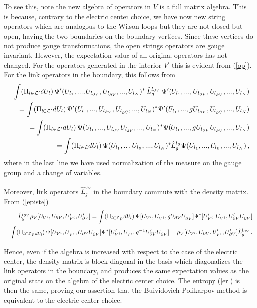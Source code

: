 \documentclass[12pt,a4paper]{article}
\newcommand{\bea}{\begin{eqnarray}}
\newcommand{\eea}{\end{eqnarray}}
\begin{document}
To see this, note the new algebra of operators in $V$ is a full matrix algebra. This is because, contrary to the electric center choice, we 
have now new string operators which are analogous to the Wilson loops but they are not closed but open, having the two boundaries on the 
boundary vertices. Since these vertices do not produce gauge transformations, the open strings operators are gauge invariant. However, 
the expectation value of all original operators has not changed. For the operators generated in the interior $V^i$ this is evident from (\ref{op}). 
For the link operators in the boundary, this follows from 
\bea
&&\int (\Pi_{l\in {\cal L}^\prime} dU_l) \,\Psi^\prime(U_{l_1},...,U_{l_{\partial V}},U_{l_{\partial \bar{V}}},...,U_{l_N})^*\, \hat{L}^{l_{\partial V}}_{g}\, \Psi^\prime(U_{l_1},...,U_{l_{\partial V}},U_{l_{\partial \bar{V}}},...,U_{l_N})\nonumber\\
&&=\int (\Pi_{l\in {\cal L}^\prime} dU_l) \,\Psi^\prime(U_{l_1},...,U_{l_{\partial V}},U_{l_{\partial \bar{V}}},...,U_{l_N})^* \Psi^\prime(U_{l_1},...,g U_{l_{\partial V}},U_{l_{\partial \bar{V}}},...,U_{l_N})\nonumber\\
&&=\int (\Pi_{l\in {\cal L}^\prime} dU_l) \,\Psi(U_{l_1},...,U_{l_{\partial V}}U_{l_{\partial \bar{V}}},...,U_{l_N})^* \Psi(U_{l_1},...,g U_{l_{\partial V}}U_{l_{\partial \bar{V}}},...,U_{l_N})\nonumber\\
&&=\int (\Pi_{l\in {\cal L}} dU_l) \,\Psi(U_{l_1},...,U_{l_{\partial}},...,U_{l_N})^* \hat{L}_g^{l_\partial}\Psi(U_{l_1},..., U_{l_{\partial}},...,U_{l_N})\,,
\eea
where in the last line we have used normalization of the measure on the gauge group and a change of variables. 

Moreover, link operators $\hat{L}_g^{l_{\partial V}}$ in the boundary commute with the density matrix. From (\ref{episte})
\bea
\hat{L}_g^{l_{\partial V}}\rho_V[U_{V^i},U_{\partial V},U_{V^i}^\prime,U_{\partial V}^\prime]=\int (\Pi_{l\in {\cal L}_{\bar{V}}} dU_{l})
\,\Psi[U_{V^i},U_{\bar{V}^i},g U_{\partial V}U_{\partial \bar{V}} ]
\Psi^*[U_{V^i}^\prime,U_{\bar{V}^i},U_{\partial V}^\prime U_{\partial \bar{V}}]\nonumber
\\
= \int (\Pi_{l\in {\cal L}_{\bar{V}} dU_{l}}) \, \Psi[U_{V^i},U_{\bar{V}^i}, U_{\partial V}U_{\partial \bar{V}} ]\Psi^*[U_{V^i}^\prime, U_{\bar{V}^i},g^{-1} U_{\partial V}^\prime U_{\partial \bar{V}}] = \rho_V[U_{V^i},U_{\partial V},U_{V^i}^\prime,U_{\partial V}^\prime]\hat{L}_g^{l_{\partial V}}\,.
\label{episte1} 
\eea

Hence, even if the algebra is increased with respect to the case of the electric center, the density matrix is block diagonal in the basis 
which diagonalizes the link operators in the boundary, and produces the same expectation values as the original state on the algebra of the 
electric center choice. The entropy (\ref{er}) is then the same, proving our assertion that the Buividovich-Polikarpov 
method is equivalent to the electric center choice.
\end{document}
